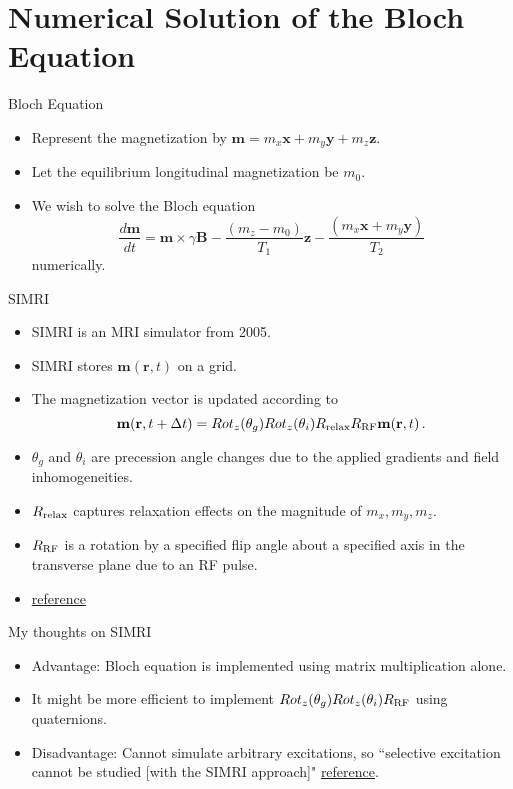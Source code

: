 \documentclass{beamer}
\begin{document}
\section{Numerical Solution of the Bloch Equation}

\begin{frame}{Bloch Equation}
\begin{itemize}
\item Represent the magnetization by $\mathbf{m} = m_x\mathbf{x}+m_y\mathbf{y}+m_z\mathbf{z}$.
\item Let the equilibrium longitudinal magnetization be $m_0$.
\item We wish to solve the Bloch equation
\begin{equation*}
\frac{d\mathbf{m}}{dt} = \mathbf{m} \times \gamma \mathbf{B} - \frac{(m_z-m_0)}{T_1}\mathbf{z} - \frac{(m_x\mathbf{x}+m_y\mathbf{y})}{T_2}
\end{equation*}
numerically.
\end{itemize}
\end{frame}

\begin{frame}{SIMRI}
\begin{itemize}
\item SIMRI is an MRI simulator from 2005.
\item SIMRI stores $\mathbf{m}(\mathbf{r},t)$ on a grid.
\item The magnetization vector is updated according to
\begin{equation*}
\mathbf{m}(\mathbf{r},t+\Delta t) = Rot_z(\theta_g)Rot_z(\theta_i)R_{\rm relax}R_{\rm RF}\mathbf{m}(\mathbf{r},t)\,.
\end{equation*}
\item $\theta_g$ and $\theta_i$ are precession angle changes due to the applied gradients and field inhomogeneities.
\item $R_{\rm relax}$ captures relaxation effects on the magnitude of $m_x,m_y,m_z$.
\item $R_{\rm RF}$ is a rotation by a specified flip angle about a specified axis in the transverse plane due to an RF pulse.
\item \href{https://www.ncbi.nlm.nih.gov/pubmed/15705518}{reference}
\end{itemize}
\end{frame}

\begin{frame}{My thoughts on SIMRI}
\begin{itemize}
\item Advantage: Bloch equation is implemented using matrix multiplication alone.
\item It might be more efficient to implement $Rot_z(\theta_g)Rot_z(\theta_i)R_{\rm RF}$ using quaternions.
\item Disadvantage: Cannot simulate arbitrary excitations, so ``selective excitation cannot be studied [with the SIMRI approach]" \href{https://www.ncbi.nlm.nih.gov/pubmed/20577987}{reference}.
\end{itemize}
\end{frame}
\end{document}
